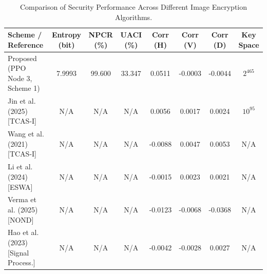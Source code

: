 \begin{table}[htbp]
\centering
\caption{Comparison of Security Performance Across Different Image Encryption Algorithms.}
\label{tab:comparison_benchmarks}
\setlength{\tabcolsep}{6pt}
\begin{tabular}{lccccccc}
\toprule
\textbf{Scheme / Reference} & \textbf{Entropy (bit)} & \textbf{NPCR (\%)} & \textbf{UACI (\%)} & \textbf{Corr (H)} & \textbf{Corr (V)} & \textbf{Corr (D)} & \textbf{Key Space} \\
\midrule
Proposed (PPO Node 3, Scheme 1) & 7.9993 & 99.600 & 33.347 & 0.0511 & -0.0003 & -0.0044 & $2^{465}$ \\
\midrule
Jin et al. (2025) [TCAS-I] & N/A & N/A & N/A & 0.0056 & 0.0017 & 0.0024 & $10^{95}$ \\
Wang et al. (2021) [TCAS-I] & N/A & N/A & N/A & -0.0088 & 0.0047 & 0.0053 & N/A \\
Li et al. (2024) [ESWA] & N/A & N/A & N/A & -0.0015 & 0.0023 & 0.0021 & N/A \\
Verma et al. (2025) [NOND] & N/A & N/A & N/A & -0.0123 & -0.0068 & -0.0368 & N/A \\
Hao et al. (2023) [Signal Process.] & N/A & N/A & N/A & -0.0042 & -0.0028 & 0.0027 & N/A \\
\bottomrule
\end{tabular}
\end{table}
